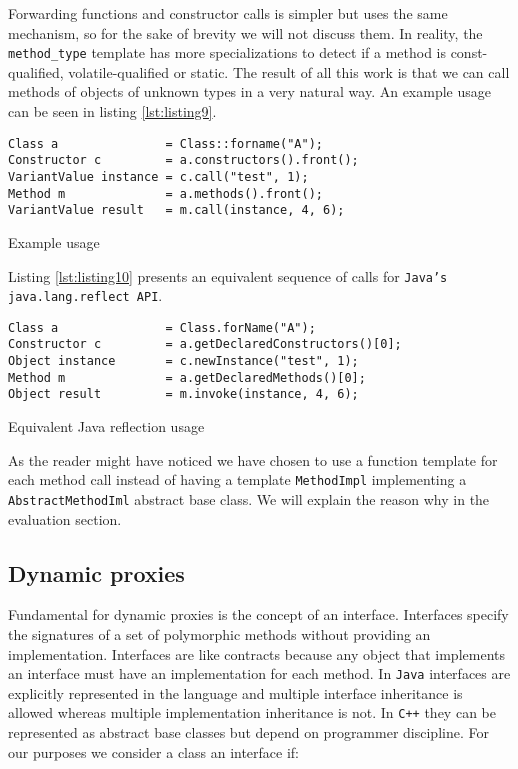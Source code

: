 Forwarding functions and constructor calls is simpler but uses the same mechanism, so for the sake of brevity we will not discuss them.
In reality, the \texttt{method\_type} template has more specializations to detect if a method is const-qualified, volatile-qualified or static.
The result of all this work is that we can call methods of objects of unknown types in a very natural way. An example usage can be seen in listing
\ref{lst:listing9}.


\begin{listing}[H]
\begin{verbatim}
Class a               = Class::forname("A");
Constructor c         = a.constructors().front();
VariantValue instance = c.call("test", 1);
Method m              = a.methods().front();
VariantValue result   = m.call(instance, 4, 6);
\end{verbatim}
\caption{Example usage}
\label{lst:listing9}
\end{listing}

Listing \ref{lst:listing10} presents an equivalent sequence of calls for \texttt{Java's java.lang.reflect API}.


\begin{listing}[H]
\begin{verbatim}
Class a               = Class.forName("A");
Constructor c         = a.getDeclaredConstructors()[0];
Object instance       = c.newInstance("test", 1);
Method m              = a.getDeclaredMethods()[0];
Object result         = m.invoke(instance, 4, 6);
\end{verbatim}
\caption{Equivalent Java reflection usage}
\label{lst:listing10}
\end{listing}

As the reader might have noticed we have chosen to use a function template for each method call instead of having a template \texttt{MethodImpl}
implementing a \texttt{AbstractMethodIml} abstract base class. We will explain the reason why in the evaluation section.

\subsection{Dynamic proxies}

Fundamental for dynamic proxies is the concept of an interface. Interfaces specify the signatures of a set of polymorphic
methods without providing an implementation. Interfaces are like contracts because any object that implements an interface
must have an implementation for each method. In \texttt{Java} interfaces are explicitly represented in the language and multiple
interface inheritance is allowed whereas multiple implementation inheritance is not. In \texttt{C++} they can be represented as abstract
base classes but depend on programmer discipline. For our purposes we consider a class an interface if:

